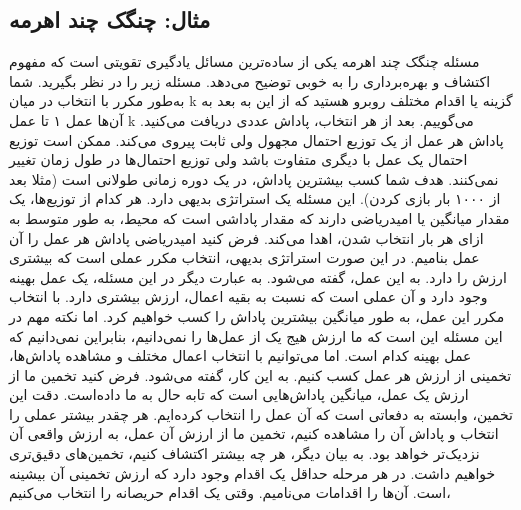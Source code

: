 \subsection{مثال: چنگک چند اهرمه}
مسئله چنگک چند اهرمه یکی از ساده‌ترین مسائل یادگیری تقویتی است که مفهوم اکتشاف و بهره‌برداری را به خوبی توضیح می‌دهد. مسئله زیر را در نظر بگیرید. شما به‌طور مکرر با انتخاب در میان k گزینه یا اقدام مختلف روبرو هستید که از این به بعد به آن‌ها عمل ۱ تا عمل k می‌گوییم. بعد از هر انتخاب، پاداش عددی دریافت می‌کنید. پاداش هر عمل از یک توزیع احتمال مجهول ولی ثابت پیروی می‌کند. ممکن است توزیع احتمال یک عمل با دیگری متفاوت باشد ولی توزیع احتمال‌ها در طول زمان تغییر نمی‌کنند. هدف شما کسب بیشترین پاداش، در یک دوره زمانی طولانی است (مثلا بعد از ۱۰۰۰ بار بازی کردن). 
 این مسئله یک استراتژی بدیهی دارد. هر کدام از توزیع‌ها، یک مقدار میانگین یا امیدریاضی دارند که مقدار پاداشی است که محیط، به طور متوسط به ازای هر بار انتخاب شدن، اهدا می‌کند. فرض کنید امیدریاضی پاداش هر عمل را  آن عمل بنامیم. در این صورت استراتژی بدیهی، انتخاب مکرر عملی است که بیشتری ارزش را دارد. به این عمل،  
 گفته می‌شود. به عبارت دیگر در این مسئله، یک عمل بهینه وجود دارد و آن عملی است که نسبت به بقیه اعمال، ارزش بیشتری دارد. با انتخاب مکرر این عمل، به طور میانگین بیشترین پاداش را کسب خواهیم کرد. اما نکته مهم در این مسئله این است که ما ارزش هیج یک از عمل‌ها را نمی‌دانیم، بنابراین نمی‌دانیم که عمل بهینه کدام است. اما می‌توانیم با انتخاب اعمال مختلف و مشاهده پاداش‌ها، تخمینی از ارزش هر عمل کسب کنیم. به این کار،  گفته می‌شود. فرض کنید تخمین ما از ارزش یک عمل، میانگین پاداش‌هایی است که تابه حال به ما داده‌است. دقت این تخمین، وابسته به دفعاتی است که آن عمل را انتخاب کرده‌ایم. هر چقدر بیشتر عملی را انتخاب و پاداش آن را مشاهده کنیم، تخمین ما از ارزش آن عمل، به ارزش واقعی آن نزدیک‌تر خواهد بود. به بیان دیگر، هر چه بیشتر اکتشاف کنیم، تخمین‌های دقیق‌تری خواهیم داشت.
در هر مرحله حداقل یک اقدام وجود دارد
که ارزش تخمینی آن بیشینه است. آن‌ها را اقدامات  می‌نامیم. وقتی یک اقدام حریصانه را انتخاب می‌کنیم،
